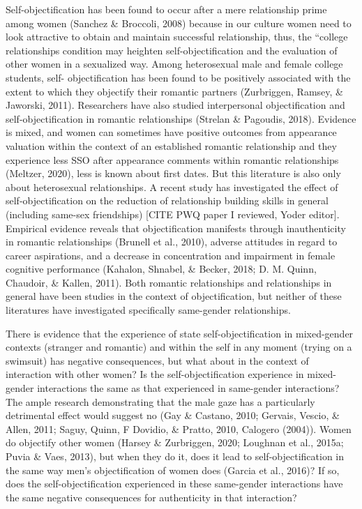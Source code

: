 \documentclass[man]{apa6}
\begin{document}
Self-objectification has been found to occur after a mere relationship
prime among women (Sanchez \& Broccoli, 2008) because in our culture
women need to look attractive to obtain and maintain successful
relationship, thus, the ``college relationships condition may heighten
self-objectification and the evaluation of other women in a sexualized
way. Among heterosexual male and female college students, self-
objectification has been found to be positively associated with the
extent to which they objectify their romantic partners (Zurbriggen,
Ramsey, \& Jaworski, 2011). Researchers have also studied interpersonal
objectification and self-objectification in romantic relationships
(Strelan \& Pagoudis, 2018). Evidence is mixed, and women can sometimes
have positive outcomes from appearance valuation within the context of
an established romantic relationship and they experience less SSO after
appearance comments within romantic relationships (Meltzer, 2020), less
is known about first dates. But this literature is also only about
heterosexual relationships. A recent study has investigated the effect
of self-objectification on the reduction of relationship building skills
in general (including same-sex friendships) {[}CITE PWQ paper I
reviewed, Yoder editor{]}. Empirical evidence reveals that
objectification manifests through inauthenticity in romantic
relationships (Brunell et al., 2010), adverse attitudes in regard to
career aspirations, and a decrease in concentration and impairment in
female cognitive performance (Kahalon, Shnabel, \& Becker, 2018; D. M.
Quinn, Chaudoir, \& Kallen, 2011). Both romantic relationships and
relationships in general have been studies in the context of
objectification, but neither of these literatures have investigated
specifically same-gender relationships.

There is evidence that the experience of state self-objectification in
mixed-gender contexts (stranger and romantic) and within the self in any
moment (trying on a swimsuit) has negative consequences, but what about
in the context of interaction with other women? Is the
self-objectification experience in mixed-gender interactions the same as
that experienced in same-gender interactions? The ample research
demonstrating that the male gaze has a particularly detrimental effect
would suggest no (Gay \& Castano, 2010; Gervais, Vescio, \& Allen, 2011;
Saguy, Quinn, F Dovidio, \& Pratto, 2010, Calogero (2004)). Women do
objectify other women (Harsey \& Zurbriggen, 2020; Loughnan et al.,
2015a; Puvia \& Vaes, 2013), but when they do it, does it lead to
self-objectification in the same way men's objectification of women does
(Garcia et al., 2016)? If so, does the self-objectification experienced
in these same-gender interactions have the same negative consequences
for authenticity in that interaction?
\end{document}
